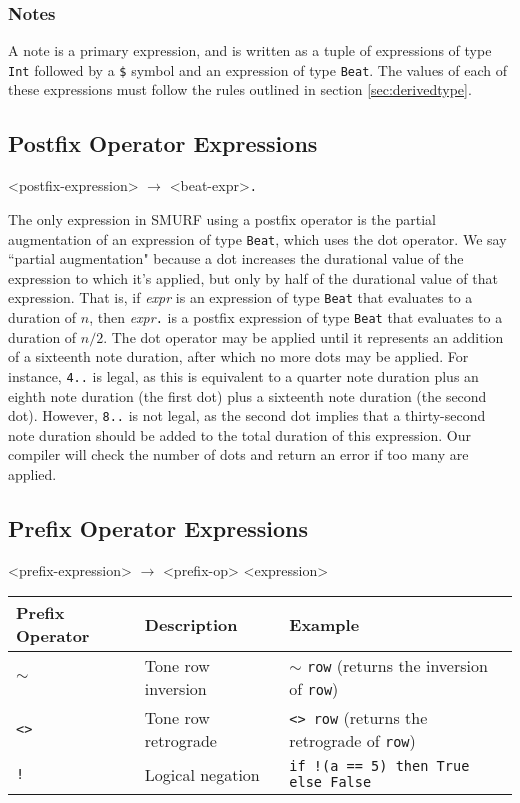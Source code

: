 \subsubsection{Notes}
A note is a primary expression, and is written as a tuple of expressions of type \texttt{Int} followed
by a \texttt{\$} symbol and an expression of type \texttt{Beat}. The values of each of these
expressions must follow the rules outlined in section \ref{sec:derivedtype}.

\subsection{Postfix Operator Expressions}
\label{sec:postfixop}

\begin{grammar}
<postfix-expression> $\rightarrow$ <beat-expr>\texttt{.}
\end{grammar}

The only expression in SMURF using a postfix operator is the partial augmentation of an expression
of type \texttt{Beat}, which uses the dot operator.
We say ``partial augmentation" because a dot increases the durational value of
the expression to which it's applied, but only by half of the durational value of that expression.
That is, if \emph{expr} is an expression of type \texttt{Beat} that evaluates to a duration of $n$, 
then \emph{expr}\texttt{.} is a postfix expression of type \texttt{Beat} 
that evaluates to a duration of $n/2$.
The dot operator may be applied until it represents an addition of a sixteenth note
duration, after which no more dots may be applied. For instance, \texttt{4..} is legal, as this
is equivalent to a quarter note duration plus an eighth note duration (the first dot) plus a
sixteenth note duration (the second dot). However, \texttt{8..} is not legal, as the second
dot implies that a thirty-second note duration should be added to the total duration of this
expression. Our compiler will check the number of dots and return an error if too many are applied.

\subsection{Prefix Operator Expressions}
\label{sec:prefixop}
\begin{grammar}
<prefix-expression> $\rightarrow$ <prefix-op> <expression>
\end{grammar}


\begin{table} [H]
\centering
\begin{tabularx}{0.9\textwidth}{llX}
\hline\hline
Prefix Operator & Description & Example \\
\hline\hline
   \texttt{$\sim$} & Tone row inversion & $\sim$ \texttt{row} (returns the inversion of \texttt{row})\\ \hline
   \texttt{<>} & Tone row retrograde & \texttt{<>}~\texttt{row} (returns the
           retrograde of \texttt{row})\\ \hline
   \texttt{!} & Logical negation & \texttt{if !(a == 5) then True else False} \\ \hline
\end{tabularx}
\end{table}

